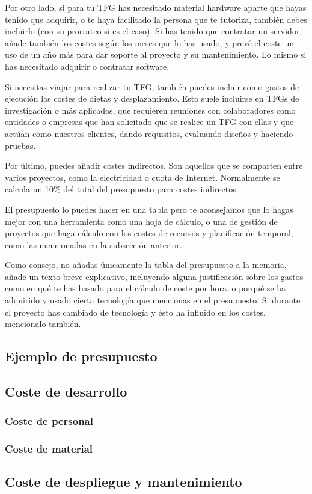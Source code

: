 Por otro lado, si para tu TFG has necesitado material hardware aparte que hayas tenido que adquirir, o te haya facilitado la persona que te tutoriza, también debes incluirlo (con su prorrateo si es el caso). Si has tenido que contratar un servidor, añade también los costes según los meses que lo has usado, y prevé el coste un uso de un año más para dar soporte al proyecto y su mantenimiento. Lo mismo si has necesitado adquirir o contratar software.

Si necesitas viajar para realizar tu TFG, también puedes incluir como gastos de ejecución los costes de dietas y desplazamiento. Esto suele incluirse en TFGs de investigación o más aplicados, que requieren reuniones con colaboradores como entidades o empresas que han solicitado que se realice un TFG con ellas y que actúan como nuestros clientes, dando requisitos, evaluando diseños y haciendo pruebas. 

Por último, puedes añadir costes indirectos. Son aquellos que se comparten entre varios proyectos, como la electricidad o cuota de Internet. Normalmente se calcula un 10\% del total del presupuesto para costes indirectos.

El presupuesto lo puedes hacer en una tabla pero te aconsejamos que lo hagas mejor con una herramienta como una hoja de cálculo, o una de gestión de proyectos que haga cálculo con los costes de recursos y planificación temporal, como las mencionadas en la subsección anterior.

Como consejo, no añadas únicamente la tabla del presupuesto a la memoria, añade un texto breve explicativo, incluyendo alguna justificación sobre los gastos como en qué te has basado para el cálculo de coste por hora, o porqué se ha adquirido y usado cierta tecnología que mencionas en el presupuesto. Si durante el proyecto has cambiado de tecnología y ésto ha influido en los costes, menciónalo también.

\subsection{Ejemplo de presupuesto}

\subsection{Coste de desarrollo}

\subsubsection{Coste de personal}

\subsubsection{Coste de material}

\subsection{Coste de despliegue y mantenimiento}